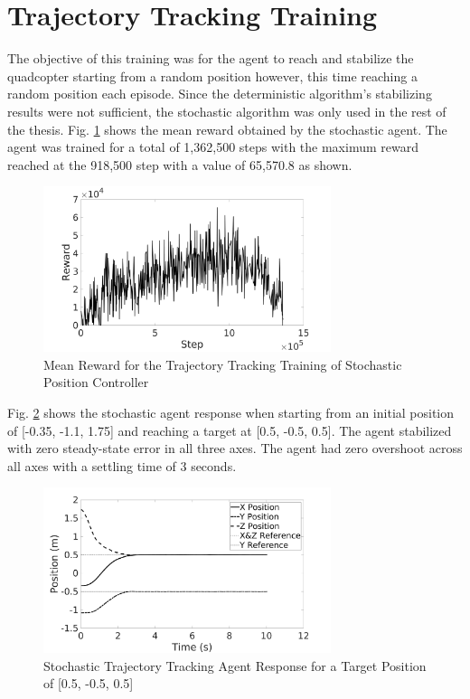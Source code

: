     \section{Trajectory Tracking Training}
    The objective of this training was for the agent to reach and stabilize the quadcopter starting from a random position however, this time reaching a random position each episode. Since the deterministic algorithm's stabilizing results were not sufficient, the stochastic algorithm was only used in the rest of the thesis. Fig. \ref{trrew} shows the mean reward obtained by the stochastic agent. The agent was trained for a total of 1,362,500 steps with the maximum reward reached at the 918,500 step with a value of 65,570.8 as shown.
      \begin{figure}[H]
            \centering
            \includegraphics[width=0.75\textwidth]{plots/track_rew.jpg}
            \caption{Mean Reward for the Trajectory Tracking Training of Stochastic Position Controller}
            \label{trrew}
    \end{figure}
     Fig. \ref{trackpos1} shows the stochastic agent response when starting from an initial position of [-0.35, -1.1, 1.75] and reaching a target at [0.5, -0.5, 0.5]. The agent stabilized with zero steady-state error in all three axes. The agent had zero overshoot across all axes with a settling time of 3 seconds.
    \begin{figure}[H]
            \centering
            \includegraphics[width=0.75\textwidth]{plots/track1_pos.jpg}
            \caption{Stochastic Trajectory Tracking Agent Response for a Target Position of [0.5, -0.5, 0.5]}
            \label{trackpos1}
    \end{figure}
